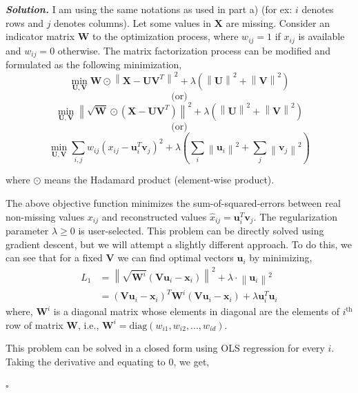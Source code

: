\documentclass[10pt]{article}
\newenvironment{solution}[1][\it{Solution}]{\textbf{#1. } }{$\square$}
\begin{document}
\begin{solution}
I am using the same notations as used in part a) (for ex: $i$ denotes rows and $j$ denotes columns). Let some values in $\mathbf{X}$ are missing. Consider an indicator matrix $\mathbf{W}$ to the optimization process, where $w_{ij}=1$ if $x_{ij}$ is available and $w_{ij}=0$ otherwise. The matrix factorization process can be modified and formulated as the following minimization,
$$
\min _{\mathbf{U}, \mathbf{V}} \mathbf{W} \odot \left\|\mathbf{X}-\mathbf{U} \mathbf{V}^{T}\right\|^{2}+\lambda\left(\left\|\mathbf{U}\right\|^{2}+\left\|\mathbf{V}\right\|^{2}\right)
$$
$$\text{(or)}$$
$$
\min _{\mathbf{U}, \mathbf{V}} \left\|\sqrt{\mathbf{W}} \odot \left(\mathbf{X}-\mathbf{U} \mathbf{V}^{T}\right)\right\|^{2}+\lambda\left(\left\|\mathbf{U}\right\|^{2}+\left\|\mathbf{V}\right\|^{2}\right)
$$
$$\text{(or)}$$
$$
\min _{\mathbf{U}, \mathbf{V}} \sum_{i, j}w_{ij}\left(x_{i j}-\mathbf{u}_{i}^{T} \mathbf{v}_{j}\right)^{2}+\lambda\left(\sum_{i}\left\|\mathbf{u}_{i}\right\|^{2}+\sum_{j}\left\|\mathbf{v}_{j}\right\|^{2}\right)
$$

where $\odot$ means the Hadamard product (element-wise product).

The above objective function minimizes the sum-of-squared-errors between real non-missing values $x_{ij}$ and reconstructed values $\hat{x}_{i j}=\mathbf{u}_{i}^{T} \mathbf{v}_{j}$. The regularization parameter $\lambda \geq 0$ is user-selected. This problem can be directly solved using gradient descent, but we will attempt a slightly different approach. To do this, we can see that for a fixed $\mathbf{V}$ we can find optimal vectors $\mathbf{u}_{i}$ by minimizing,
\begin{align*}
L_{1} &= \left\|\sqrt{\mathbf{W}^{i}}\left(\mathbf{V} \mathbf{u}_{i}-\mathbf{x}_{i}\right)\right\|^{2}+\lambda \cdot\left\|\mathbf{u}_{i}\right\|^{2}\\
      &= \left(\mathbf{V}\mathbf{u}_i-\mathbf{x}_i\right)^{T}\mathbf{W}^{i}\left(\mathbf{V}\mathbf{u}_i-\mathbf{x}_i\right) + \lambda\mathbf{u}_i^{T}\mathbf{u}_i
\end{align*}
where, $\mathbf{W}^{i}$ is a diagonal matrix whose elements in diagonal are the elements of $i^{\text{th}}$ row of matrix $\mathbf{W}$, i.e., $\mathbf{W}^{i} = \text{diag}\left(w_{i1}, w_{i2}, ..., w_{id}\right)$.

This problem can be solved in a closed form using OLS regression for every $i$. Taking the derivative and equating to $0$, we get,



\end{solution}
\end{document}
